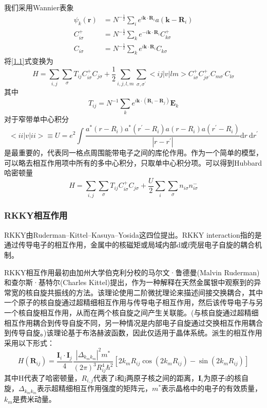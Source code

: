 我们采用Wannier表象
\begin{align*}
    \psi_k(\textbf{r})&=N^{-\frac{1}{2}}\sum_i e^{i\textbf{k}\cdot \textbf{R}_i} a(\textbf{k} - \textbf{R}_i)\\
    C^+_{i \sigma}&=N^{-\frac{1}{2}} \sum_k e^{- i\textbf{k}\cdot \textbf{R}_i} C^+_{k \sigma}\\
    C_{i \sigma}&=N^{-\frac{1}{2}} \sum_k e^{i\textbf{k}\cdot \textbf{R}_i} C_{k \sigma}
\end{align*}
将\ref{1.1}式变换为
$$
H=\sum_{i, j} \sum_{\sigma} T_{i j} C_{i \sigma}^{+} C_{j \sigma}+\frac{1}{2} \sum_{i, j, l, m} \sum_{\sigma, \sigma^{\prime}}<i j|v| l m>C_{i \sigma}^{+} C_{j \sigma^{\prime}}^{+} C_{m \sigma^{\prime}} C_{l \sigma}
$$
其中
$$T_{ij}=N^{-1}\sum_k e^{i \textbf{k} \cdot (\textbf{R}_i-\textbf{R}_j)}\textbf{E}_k$$
对于窄带单中心积分
$$
<i i|v| i i>\equiv U=e^{2} \int \frac{a^{*}\left(r-R_{i}\right) a^{*}\left(r^{\prime}-R_{i}\right) a\left(r-R_{i}\right) a\left(r^{\prime}-R_{i}\right)}{\left|r-r^{\prime}\right|} \mathrm{d} r \mathrm{~d} r^{\prime}
$$
是最重要的，代表同一格点周围能带电子之间的库伦作用。作为一个简单的模型，可以略去相互作用项中所有的多中心积分，只取单中心积分项。可以得到Hubbard哈密顿量
$$
H=\sum_{i, j} \sum_{\sigma} T_{i j} C_{i \sigma}^{+} C_{j \sigma}+\frac{U}{2} \sum_{i} \sum_{\sigma} n_{i \sigma} n_{i \sigma}^{-}
$$
\subsubsection{RKKY相互作用}
RKKY由Ruderman–Kittel–Kasuya–Yosida这四位提出。RKKY interaction指的是通过传导电子的相互作用，金属中的核磁矩或局域内部d或f壳层电子自旋的耦合机制。

RKKY相互作用最初由加州大学伯克利分校的马尔文·鲁德曼(Malvin Ruderman)和查尔斯·基特尔(Charles Kittel)提出，作为一种解释在天然金属银中观察到的异常宽的核自旋共振线的方法。该理论使用二阶微扰理论来描述间接交换耦合，其中一个原子的核自旋通过超精细相互作用与传导电子相互作用，然后该传导电子与另一个核自旋相互作用，从而在两个核自旋之间产生关联能。(与核自旋通过超精细相互作用耦合到传导自旋不同，另一种情况是内部电子自旋通过交换相互作用耦合到传导自旋。)该理论基于布洛赫波函数，因此仅适用于晶体系统。派生的相互作用采用以下形式：
$$
H\left(\mathbf{R}_{i j}\right)=\frac{\mathbf{I}_{i} \cdot \mathbf{I}_{j}}{4} \frac{\left|\Delta_{k_{m} k_{m}}\right|^{2} m^{*}}{(2 \pi)^{3} R_{i j}^{4} \hbar^2}\left[2 k_{m} R_{i j} \cos \left(2 k_{m} R_{i j}\right)-\sin \left(2 k_{m} R_{i j}\right)\right]
$$
其中H代表了哈密顿量，$R_{i,j}$代表了i和j两原子核之间的距离，$\mathbf{I}_i$为原子i的核自旋，$\Delta_{k_{m}k_m}$表示超精细相互作用强度的矩阵元，$m^*$表示晶格中的电子的有效质量，$k_m$是费米动量。 

